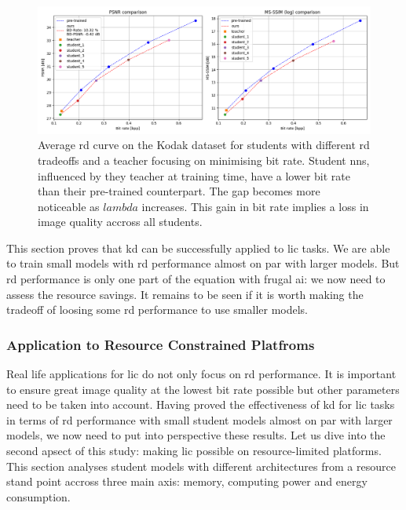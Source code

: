 \documentclass{article}
\begin{document}
\begin{figure}
    \centering
    \includegraphics[width=15cm]{../img/kd_lic_rd_lambda_2.png}
    \caption[Average \acrshort{rd} curve on the Kodak dataset for students with different \acrshort{rd} tradeoffs and a teacher focusing on minimising bit rate.]{Average \acrshort{rd} curve on the Kodak dataset for students with different \acrshort{rd} tradeoffs and a teacher focusing on minimising bit rate. Student \acrshort{nn}s, influenced by they teacher at training time, have a lower bit rate than their pre-trained counterpart. The gap becomes more noticeable as \(lambda\) increases. This gain in bit rate implies a loss in image quality accross all students.}
    \label{kd_lic_4_bis}
\end{figure}

This section proves that \acrshort{kd} can be successfully applied to \acrshort{lic} tasks. We are able to train small models with \acrshort{rd} performance almost on par with larger models. But \acrshort{rd} performance is only one part of the equation with frugal \acrshort{ai}: we now need to assess the resource savings. It remains to be seen if it is worth making the tradeoff of loosing some \acrshort{rd} performance to use smaller models.

\subsubsection{Application to Resource Constrained Platfroms}
\label{application_resource_contrained_platforms}
Real life applications for \acrshort{lic} do not only focus on \acrshort{rd} performance. It is important to ensure great image quality at the lowest bit rate possible but other parameters need to be taken into account. Having proved the effectiveness of \acrshort{kd} for \acrshort{lic} tasks in terms of \acrshort{rd} performance with small student models almost on par with larger models, we now need to put into perspective these results. Let us dive into the second apsect of this study: making \acrshort{lic} possible on resource-limited platforms. This section analyses student models with different architectures from a resource stand point accross three main axis: memory, computing power and energy consumption.
\end{document}
